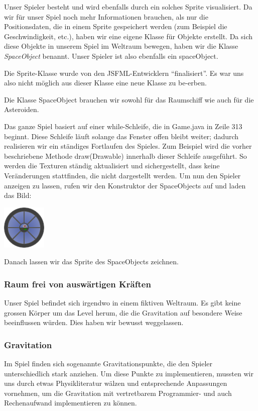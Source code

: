\documentclass[12pt,a4paper]{scrartcl}
\newcommand{\q}[1]{``#1''}
\begin{document}
Unser Spieler besteht und wird ebenfalls durch ein solches Sprite visualisiert.
Da wir für unser Spiel noch mehr Informationen brauchen, als nur die Positionsdaten, die in einem
Sprite gespeichert werden (zum Beispiel die Geschwindigkeit, etc.), haben wir eine eigene Klasse für Objekte erstellt. Da sich diese Objekte
in unserem Spiel im Weltraum bewegen, haben wir die Klasse \textit{SpaceObject} benannt. Unser Spieler ist also ebenfalls ein spaceObject.

Die Sprite-Klasse wurde von den JSFML-Entwicklern \q{finalisiert}. Es war uns also nicht
möglich aus dieser Klasse eine neue Klasse zu be-erben.


Die Klasse SpaceObject brauchen wir sowohl für das Raumschiff wie auch für die Asteroiden.


Das ganze Spiel basiert auf einer while-Schleife, die in Game.java in Zeile 313 beginnt.
Diese Schleife läuft solange das Fenster offen bleibt weiter; dadurch realisieren wir ein ständiges Fortlaufen des Spieles.
Zum Beispiel wird die vorher beschriebene Methode draw(Drawable) innerhalb dieser Schleife ausgeführt.
So werden die Texturen ständig aktualisiert und sichergestellt, dass keine Veränderungen stattfinden, die nicht dargestellt werden.
Um nun den Spieler anzeigen zu lassen, rufen wir den Konstruktor der SpaceObjects auf und laden das Bild: 	\\

\begin{center}
\includegraphics[scale=1]{img/spieler.png}
\end{center}

Danach lassen wir das Sprite des SpaceObjects zeichnen.




\subsubsection{Raum frei von auswärtigen Kräften}
Unser Spiel befindet sich irgendwo in einem fiktiven Weltraum. Es gibt keine grossen Körper um das
Level herum, die die Gravitation auf besondere Weise beeinflussen würden. Dies haben wir bewusst weggelassen.


\subsubsection{Gravitation}
Im Spiel finden sich sogenannte Gravitationspunkte, die den Spieler unterschiedlich stark anziehen.
Um diese Punkte zu implementieren, mussten wir uns durch etwas Physikliteratur wälzen und entsprechende
Anpassungen vornehmen, um die Gravitation mit vertretbarem Programmier- und auch Rechenaufwand implementieren zu können.  \\
\end{document}
